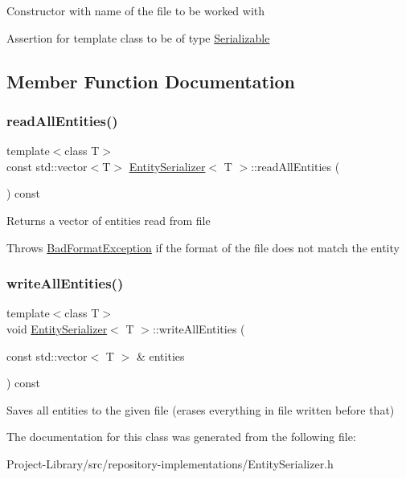 Constructor with name of the file to be worked with

Assertion for template class to be of type \hyperlink{classSerializable}{Serializable} 

\subsection{Member Function Documentation}
\mbox{\label{classEntitySerializer_a4ca6b46341d27711980e48914efde897}} 
\subsubsection{\texorpdfstring{read\+All\+Entities()}{readAllEntities()}}
{\footnotesize\ttfamily template$<$class T$>$ \\
const std\+::vector$<$T$>$ \hyperlink{classEntitySerializer}{Entity\+Serializer}$<$ T $>$\+::read\+All\+Entities (\begin{DoxyParamCaption}{ }\end{DoxyParamCaption}) const\hspace{0.3cm}{\ttfamily [inline]}}

Returns a vector of entities read from file

Throws \hyperlink{structBadFormatException}{Bad\+Format\+Exception} if the format of the file does not match the entity \mbox{\label{classEntitySerializer_a763ccba2e88a71f6768a8d07866574b1}} 
\subsubsection{\texorpdfstring{write\+All\+Entities()}{writeAllEntities()}}
{\footnotesize\ttfamily template$<$class T$>$ \\
void \hyperlink{classEntitySerializer}{Entity\+Serializer}$<$ T $>$\+::write\+All\+Entities (\begin{DoxyParamCaption}\item[{const std\+::vector$<$ T $>$ \&}]{entities }\end{DoxyParamCaption}) const\hspace{0.3cm}{\ttfamily [inline]}}

Saves all entities to the given file (erases everything in file written before that) 

The documentation for this class was generated from the following file\+:\begin{DoxyCompactItemize}
\item 
Project-\/\+Library/src/repository-\/implementations/Entity\+Serializer.\+h\end{DoxyCompactItemize}
